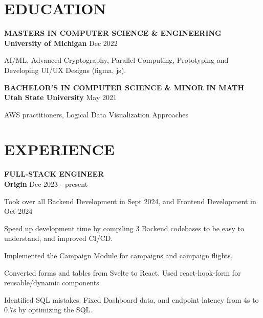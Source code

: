 \documentclass[a4paper,11pt]{article}
\newcommand{\bub}[1]{{\color{color} \MakeUppercase{\textbf{#1}}}}
\newcommand{\experience}[4]{
    \bub{#1} \\
    \textbf{#2} \hfill #3
    \begin{iitemize}
        #4
    \end{iitemize}
}
\begin{document}
\pagestyle{empty}


\header

\section{EDUCATION}

\experience{Masters in Computer Science \& Engineering}{University of Michigan}{Dec 2022}{
    \item AI/ML, Advanced Cryptography, Parallel Computing, Prototyping and Developing UI/UX Designs (figma, js). 
}

\experience{Bachelor's in Computer Science \& Minor in Math}{Utah State University}{May 2021}{
    \item AWS practitioners, Logical Data Visualization Approaches 
}

\section{EXPERIENCE}

\experience{Full-Stack Engineer}{Origin}{Dec 2023 - present}{
    \item Took over all Backend Development in Sept 2024, and Frontend Development in Oct 2024
    \item Speed up development time by compiling 3 Backend codebases to be easy to understand, and improved CI/CD.
    \item Implemented the Campaign Module for campaigns and campaign flights.
    \item Converted forms and tables from Svelte to React. Used react-hook-form for reusable/dynamic components.
    \item Identified SQL mistakes. Fixed Dashboard data, and endpoint latency from 4s to 0.7s by optimizing the SQL.
}
\end{document}
